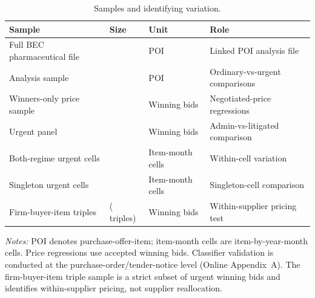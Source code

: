 \begin{table}[ht]
\centering
\caption{Samples and identifying variation.}
\label{tab:sample_variation_v9}
\begin{threeparttable}
\small
\setlength{\tabcolsep}{5pt}
\begin{tabular}{@{}l l l l@{}}
\toprule
Sample & Size & Unit & Role \\
\midrule
Full BEC pharmaceutical file & \BPnPOIfull{} & POI & Linked POI analysis file \\
Analysis sample & \BPnAnalysisSample{} & POI & Ordinary-vs-urgent comparisons \\
Winners-only price sample & \BPnegNobs{} & Winning bids & Negotiated-price regressions \\
Urgent panel & \BPnUTG{} & Winning bids & Admin-vs-litigated comparison \\
Both-regime urgent cells & \BPbothCellN{} & Item-month cells & Within-cell variation \\
Singleton urgent cells & \BPbothCellNSingleton{} & Item-month cells & Singleton-cell comparison \\
Firm-buyer-item triples & \BPutgTripleNUTG{} (\BPutgTripleCountUTG{} triples) & Winning bids & Within-supplier pricing test \\
\bottomrule
\end{tabular}
\begin{tablenotes}[flushleft]\footnotesize
\item \textit{Notes:} POI denotes purchase-offer-item; item-month cells are item-by-year-month cells. Price regressions use accepted winning bids. Classifier validation is conducted at the purchase-order/tender-notice level (Online Appendix~A). The firm-buyer-item triple sample is a strict subset of urgent winning bids and identifies within-supplier pricing, not supplier reallocation.
\end{tablenotes}
\end{threeparttable}
\end{table}
